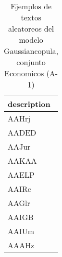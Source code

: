 \begin{table}[H]
\centering
\fontsize{8}{14}\selectfont
\caption{Ejemplos de textos aleatoreos del modelo Gaussiancopula, conjunto Economicos (A-1)}
\label{table-sample10-economicos-a-1-gaussiancopula-text}
\begin{tabular}{|m{50em}|}
\hline
\rowcolor[gray]{0.8}
description \\
\hline AAHrj \\
\hline AADED \\
\hline AAJur \\
\hline AAKAA \\
\hline AAELP \\
\hline AAIRc \\
\hline AAGlr \\
\hline AAIGB \\
\hline AAIUm \\
\hline AAAHz \\
\hline
\end{tabular}
\end{table}
